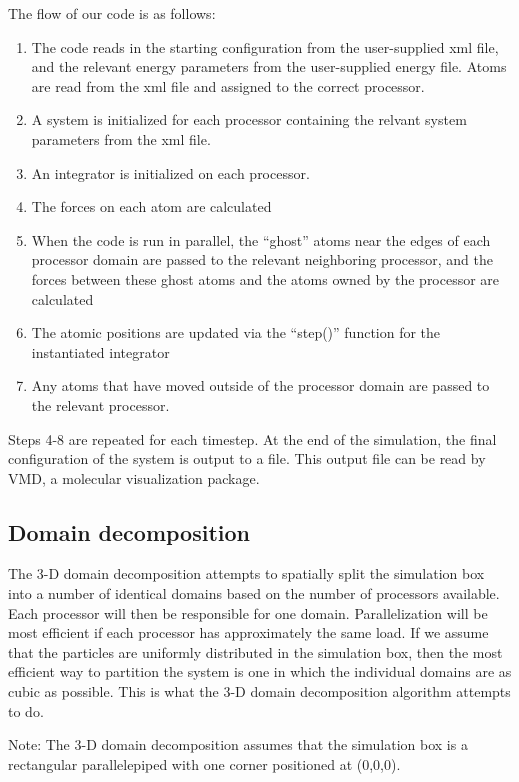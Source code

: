 \documentclass[10pt]{article}
\begin{document}
The flow of our code is as follows:
\begin{enumerate}
\item The code reads in the starting configuration from the user-supplied xml file, and the relevant energy parameters from the user-supplied energy file. Atoms are read from the xml file and assigned to the correct processor. 
\item A system is initialized for each processor containing the relvant system parameters from the xml file.
\item An integrator is initialized on each processor. 
\item The forces on each atom are calculated
\item When the code is run in parallel, the ``ghost'' atoms near the edges of each processor domain are passed to the relevant neighboring processor, and the forces between these ghost atoms and the atoms owned by the processor are calculated
\item The atomic positions are updated via the ``step()'' function for the instantiated integrator
\item Any atoms that have moved outside of the processor domain are passed to the relevant processor.
\end{enumerate}
Steps 4-8 are repeated for each timestep. 
%
At the end of the simulation, the final configuration of the system is output to a file.
%
This output file can be read by VMD, a molecular visualization package.

\subsection{Domain decomposition}
The 3-D domain decomposition attempts to spatially split the simulation box into a number of
identical domains based on the number of processors available. Each processor will then be responsible
for one domain. Parallelization will be most efficient if each processor has approximately the same load.
If we assume that the particles are uniformly distributed in the simulation box, then the most efficient
way to partition the system is one in which the individual domains are as cubic as possible. This is what
the 3-D domain decomposition algorithm attempts to do.

Note: The 3-D domain decomposition assumes that the simulation box is a rectangular parallelepiped
with one corner positioned at (0,0,0).
\end{document}
